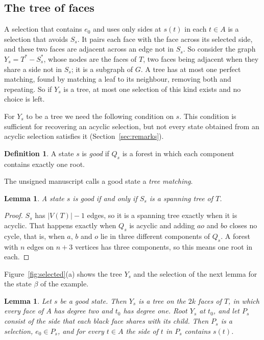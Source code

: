 \documentclass[10pt]{amsart}
\numberwithin{equation}{section}
\newtheorem{lemma}[equation]{Lemma}
\theoremstyle{definition}
\newtheorem{definition}[equation]{Definition}
\theoremstyle{remark}
\newcommand{\T}{T}
\begin{document}
\subsection*{The tree of faces}
A selection that contains $e_0$ and uses only sides at $s(t)$ in each $t\in A$ is a selection that avoids $S_s$.
It pairs each face with the face across its selected side, and these two faces are adjacent across an edge not in $S_s$.
So consider the graph $Y_s=\T^*-S_s^*$, whose nodes are the faces of $\T$, two faces being adjacent when they share a side not in $S_s$; it is a subgraph of $G$.
A tree has at most one perfect matching, found by matching a leaf to its neighbour, removing both and repeating.
So if $Y_s$ is a tree, at most one selection of this kind exists and no choice is left.

For $Y_s$ to be a tree we need the following condition on $s$.
This condition is sufficient for recovering an acyclic selection, but not every state obtained from an acyclic selection satisfies it (Section~\ref{sec:remarks}).

\begin{definition}
A state $s$ is \emph{good} if $Q_s$ is a forest in which each component contains exactly one root.
\end{definition}

The unsigned manuscript \cite{Anonymous2026} calls a good state a \emph{tree matching}.

\begin{lemma}\label{lem:good}
A state $s$ is good if and only if $S_s$ is a spanning tree of $\T$.
\end{lemma}

\begin{proof}
$S_s$ has $|V(\T)|-1$ edges, so it is a spanning tree exactly when it is acyclic.
That happens exactly when $Q_s$ is acyclic and adding $ao$ and $bo$ closes no cycle, that is, when $a$, $b$ and $o$ lie in three different components of $Q_s$.
A forest with $n$ edges on $n+3$ vertices has three components, so this means one root in each.
\end{proof}

Figure~\ref{fig:selected}(a) shows the tree $Y_s$ and the selection of the next lemma for the state $\beta$ of the example.

\begin{lemma}\label{lem:Y}
Let $s$ be a good state.
Then $Y_s$ is a tree on the $2k$ faces of $\T$, in which every face of $A$ has degree two and $t_0$ has degree one.
Root $Y_s$ at $t_0$, and let $P_s$ consist of the side that each black face shares with its child.
Then $P_s$ is a selection, $e_0\in P_s$, and for every $t\in A$ the side of $t$ in $P_s$ contains $s(t)$.
\end{lemma}
\end{document}
